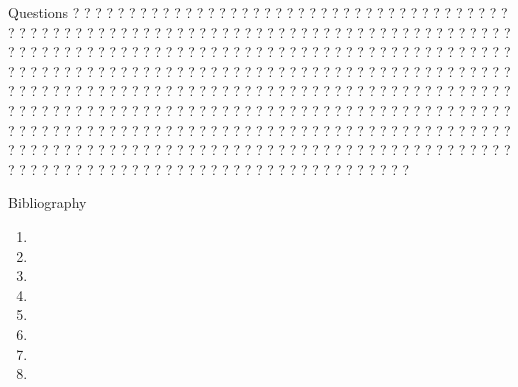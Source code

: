 \documentclass[pdf, autumn, slideColor, nocolorBG]{prosper}
\begin{document}






\begin{slide}{Questions}
? ? ? ? ? ? ? ? ? ? ? ? ? ? ? ? ? ? ? ? ? ? ? ? ? ? ? ? ? ? ? 
? ? ? ? ? ? ? ? ? ? ? ? ? ? ? ? ? ? ? ? ? ? ? ? ? ? ? ? ? ? ? 
? ? ? ? ? ? ? ? ? ? ? ? ? ? ? ? ? ? ? ? ? ? ? ? ? ? ? ? ? ? ? 
? ? ? ? ? ? ? ? ? ? ? ? ? ? ? ? ? ? ? ? ? ? ? ? ? ? ? ? ? ? ? 
? ? ? ? ? ? ? ? ? ? ? ? ? ? ? ? ? ? ? ? ? ? ? ? ? ? ? ? ? ? ? 
? ? ? ? ? ? ? ? ? ? ? ? ? ? ? ? ? ? ? ? ? ? ? ? ? ? ? ? ? ? ? 
? ? ? ? ? ? ? ? ? ? ? ? ? ? ? ? ? ? ? ? ? ? ? ? ? ? ? ? ? ? ? 
? ? ? ? ? ? ? ? ? ? ? ? ? ? ? ? ? ? ? ? ? ? ? ? ? ? ? ? ? ? ? 
? ? ? ? ? ? ? ? ? ? ? ? ? ? ? ? ? ? ? ? ? ? ? ? ? ? ? ? ? ? ? 
? ? ? ? ? ? ? ? ? ? ? ? ? ? ? ? ? ? ? ? ? ? ? ? ? ? ? ? ? ? ? 
? ? ? ? ? ? ? ? ? ? ? ? ? ? ? ? ? ? ? ? ? ? ? ? ? ? ? ? ? ? ? 
? ? ? ? ? ? ? ? ? ? ? ? ? ? ? ? ? ? ? ? ? ? ? ? ? ? ? ? ? ? ? 
? ? ? ? ? ? ? ? ? ? ? ? ? ? ? ? ? ?
\end{slide}

\begin{slide}{Bibliography}
\tiny
\begin{enumerate}
    \item {}
    \item {}
    \item {}
    \item {}
    \item {}
    \item {}
    \item {}
    \item {}
\end{enumerate}
\end{slide}
\end{document}
